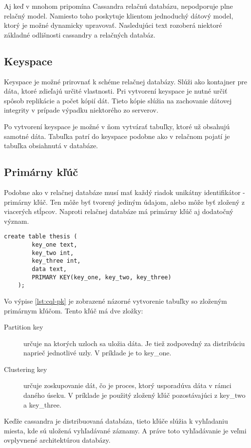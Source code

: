 	Aj keď v mnohom pripomína Cassandra relačnú databázu, nepodporuje plne relačný model. Namiesto toho poskytuje klientom jednoduchý dátový model, ktorý je možné dynamicky upravovať. Nasledujúci text rozoberá niektoré základné odlišnosti cassandry a relačných databáz.
	\subsection{Keyspace}
	Keyspace je možné prirovnať k schéme relačnej databázy. Slúži ako kontajner pre dáta, ktoré zdieľajú určité vlastnosti. Pri vytvorení keyspace je nutné určiť spôsob replikácie a počet kópií dát. Tieto kópie slúžia na zachovanie dátovej integrity v prípade výpadku niektorého zo serverov.
	
	Po vytvorení keyspace je možné v ňom vytvárať tabuľky, ktoré už obsahujú samotné dáta. Tabuľka patrí do keyspace podobne ako v relačnom pojatí je tabuľka obsiahnutá v databáze.

	\subsection{Primárny kľúč}
	Podobne ako v relačnej databáze musí mať každý riadok unikátny identifikátor - primárny kľúč. Ten môže byť tvorený jediným údajom, alebo môže byť zložený z viacerých stĺpcov. Naproti relačnej databáze má primárny kľúč aj dodatočný význam.
	
	\begin{lstlisting}[label=lst:cql-pk,caption=Tvorenie primárneho kľúča v CQL]
	create table thesis (
		key_one text,
		key_two int,
		key_three int,
		data text,
		PRIMARY KEY(key_one, key_two, key_three)
	);
	\end{lstlisting}
	
	Vo výpise \ref{lst:cql-pk} je zobrazené názorné vytvorenie tabuľky so zloženým primárnym kľúčom. Tento kľúč má dve zložky:
	\begin{description}
		\item[Partition key] určuje na ktorých uzloch sa uložia dáta. Je tiež zodpovedný za distribúciu naprieč jednotlivé uzly. V príklade je to key\_one.
		\item[Clustering key] určuje zoskupovanie dát, čo je proces, ktorý usporadúva dáta v rámci daného úseku. V príklade je použitý zložený kľúč pozostávajúci z key\_two a key\_three.
	\end{description}
	Keďže cassandra je distribuovaná databáza, tieto kľúče slúžia k vyhľadaniu miesta, kde sú uložená vyhľadávané záznamy. A práve toto vyhľadávanie je veľmi ovplyvnené architektúrou databázy.
	
